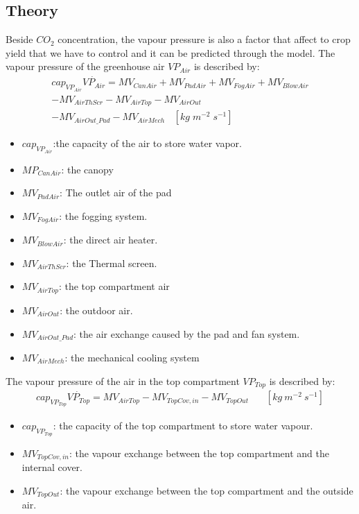 \documentclass[a4paper]{article}
\numberwithin{equation}{section}
\begin{document}
\subsection{Theory}
Beside $CO_2$ concentration, the vapour pressure is also a factor that affect to crop yield that we have to control and it can be predicted through the model.
The vapour pressure of the greenhouse air \(VP_{Air}\) is described by:
\begin{multline*}
  cap_{VP_{Air}}\dot{VP_{Air}} = MV_{CanAir} + MV_{PadAir} + MV_{FogAir} + MV_{BlowAir} \\
  - MV_{AirThScr} - MV_{AirTop} - MV_{AirOut} \\
  - MV_{AirOut\_Pad} - MV_{AirMech} ~~~~ [kg\;m^{-2}\;s^{-1}]
\end{multline*}
\begin{itemize}
    \item \(cap_{VP_{Air}}\):the capacity of the air to store water vapor.
    \item \(MP_{CanAir}\): the canopy
    \item \(MV_{PadAir}\): The outlet air of the pad
    \item \(MV_{FogAir}\): the fogging system.
    \item \(MV_{BlowAir}\): the direct air heater.
    \item \(MV_{AirThScr}\): the Thermal screen.
    \item \(MV_{AirTop}\): the top compartment air
    \item \(MV_{AirOut}\): the outdoor air.
    \item \(MV_{AirOut\_Pad}\): the air exchange caused by the pad and fan system.
    \item \(MV_{AirMech}\): the mechanical cooling system
\end{itemize}
The vapour pressure of the air in the top compartment \(VP_{Top}\) is described by: 
\begin{multline*}
  cap_{VP_{Top}}\dot{VP_{Top}} = MV_{AirTop} - MV_{TopCov,in} - MV_{TopOut} ~~~~~~~~ [kg\ m^{-2}\ s^{-1}]
\end{multline*}
\begin{itemize}
    \item \(cap_{VP_{Top}}\): the capacity of the top compartment to store water vapour.
    \item \(MV_{TopCov,in}\): the vapour exchange between the top compartment and the internal cover.
    \item \(MV_{TopOut}\): the vapour exchange between the top compartment and the outside air.
\end{itemize}
\end{document}
